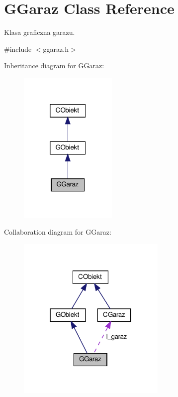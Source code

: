\hypertarget{class_g_garaz}{}\section{G\+Garaz Class Reference}
\label{class_g_garaz}


Klasa graficzna garazu.  




{\ttfamily \#include $<$ggaraz.\+h$>$}



Inheritance diagram for G\+Garaz\+:\nopagebreak
\begin{figure}[H]
\begin{center}
\leavevmode
\includegraphics[width=133pt]{class_g_garaz__inherit__graph}
\end{center}
\end{figure}


Collaboration diagram for G\+Garaz\+:\nopagebreak
\begin{figure}[H]
\begin{center}
\leavevmode
\includegraphics[width=202pt]{class_g_garaz__coll__graph}
\end{center}
\end{figure}
